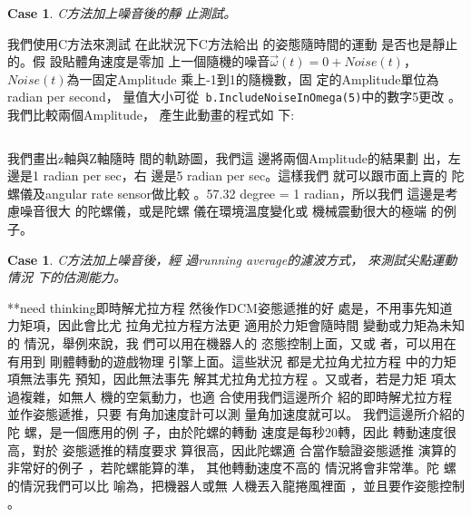 \documentclass[12pt,twoside]{article}
\newtheorem{case}[theorem]{Case}
\begin{document}
\bigskip

\begin{case}
C方法加上噪音後的靜%
止測試。
\end{case}

我們使用C方法來測試%
在此狀況下C方法給出%
的姿態隨時間的運動%
是否也是靜止的。假%
設貼體角速度是零加%
上一個隨機的噪音$\vec{\omega}%
(t)=0+Noise(t)$，$Noise(t)$為一固定Amplitude%
乘上-1到1的隨機數，固%
定的Amplitude單位為radian per second，%
量值大小可從\texttt{%
b.IncludeNoiseInOmega(5)}中的數字5更改%
。我們比較兩個Amplitude，%
產生此動畫的程式如%
下:

\bigskip

\begin{mdframed}[leftline=false, rightline=false,backgroundcolor=bg]
\inputminted[linenos,fontsize=\footnotesize]{python}{../../Scripts/cordtrans/sketch-NoiseIncludeInCMethod.py}
\end{mdframed}%

\bigskip

我們畫出z軸與Z軸隨時%
間的軌跡圖，我們這%
邊將兩個Amplitude的結果劃%
出，左邊是1 radian per sec，右%
邊是5 radian per sec。這樣我們%
就可以跟市面上賣的%
陀螺儀及angular rate sensor做比較%
。57.32 degree = 1 radian，所以我們%
這邊是考慮噪音很大%
的陀螺儀，或是陀螺%
儀在環境溫度變化或%
機械震動很大的極端%
的例子。

%
\begin{center}

\end{center}%

\bigskip

\begin{case}
C方法加上噪音後，經%
過running average的濾波方式，%
來測試尖點運動情況%
下的估測能力。
\end{case}

\bigskip

**need thinking即時解尤拉方程%
然後作DCM姿態遞推的好%
處是，不用事先知道%
力矩項，因此會比尤%
拉角尤拉方程方法更%
適用於力矩會隨時間%
變動或力矩為未知的%
情況，舉例來說，我%
們可以用在機器人的%
恣態控制上面，又或%
者，可以用在有用到%
剛體轉動的遊戲物理%
引擎上面。這些狀況%
都是尤拉角尤拉方程%
中的力矩項無法事先%
預知，因此無法事先%
解其尤拉角尤拉方程%
。又或者，若是力矩%
項太過複雜，如無人%
機的空氣動力，也適%
合使用我們這邊所介%
紹的即時解尤拉方程%
並作姿態遞推，只要%
有角加速度計可以測%
量角加速度就可以。%
我們這邊所介紹的陀%
螺，是一個應用的例%
子，由於陀螺的轉動%
速度是每秒20轉，因此%
轉動速度很高，對於%
姿態遞推的精度要求%
算很高，因此陀螺適%
合當作驗證姿態遞推%
演算的非常好的例子%
，若陀螺能算的準，%
其他轉動速度不高的%
情況將會非常準。陀%
螺的情況我們可以比%
喻為，把機器人或無%
人機丟入龍捲風裡面%
，並且要作姿態控制%
。
\end{document}
